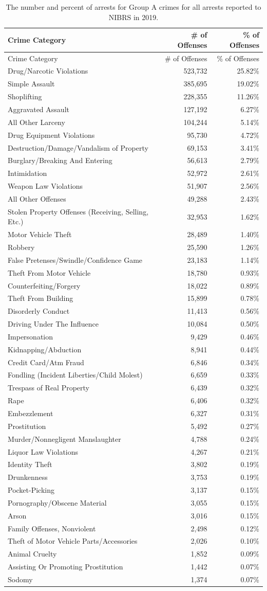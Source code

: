 \documentclass[
  12pt,
  openany]{book}
\begin{document}
\begin{longtable}[]{@{}lrr@{}}
\caption{\label{tab:arresteeCrime}The number and percent of arrests for Group A crimes for all arrests reported to NIBRS in 2019.}\tabularnewline
\toprule
Crime Category & \# of Offenses & \% of Offenses\tabularnewline
\midrule
\endfirsthead
\toprule
Crime Category & \# of Offenses & \% of Offenses\tabularnewline
\midrule
\endhead
Drug/Narcotic Violations & 523,732 & 25.82\%\tabularnewline
Simple Assault & 385,695 & 19.02\%\tabularnewline
Shoplifting & 228,355 & 11.26\%\tabularnewline
Aggravated Assault & 127,192 & 6.27\%\tabularnewline
All Other Larceny & 104,244 & 5.14\%\tabularnewline
Drug Equipment Violations & 95,730 & 4.72\%\tabularnewline
Destruction/Damage/Vandalism of Property & 69,153 & 3.41\%\tabularnewline
Burglary/Breaking And Entering & 56,613 & 2.79\%\tabularnewline
Intimidation & 52,972 & 2.61\%\tabularnewline
Weapon Law Violations & 51,907 & 2.56\%\tabularnewline
All Other Offenses & 49,288 & 2.43\%\tabularnewline
Stolen Property Offenses (Receiving, Selling, Etc.) & 32,953 & 1.62\%\tabularnewline
Motor Vehicle Theft & 28,489 & 1.40\%\tabularnewline
Robbery & 25,590 & 1.26\%\tabularnewline
False Pretenses/Swindle/Confidence Game & 23,183 & 1.14\%\tabularnewline
Theft From Motor Vehicle & 18,780 & 0.93\%\tabularnewline
Counterfeiting/Forgery & 18,022 & 0.89\%\tabularnewline
Theft From Building & 15,899 & 0.78\%\tabularnewline
Disorderly Conduct & 11,413 & 0.56\%\tabularnewline
Driving Under The Influence & 10,084 & 0.50\%\tabularnewline
Impersonation & 9,429 & 0.46\%\tabularnewline
Kidnapping/Abduction & 8,941 & 0.44\%\tabularnewline
Credit Card/Atm Fraud & 6,846 & 0.34\%\tabularnewline
Fondling (Incident Liberties/Child Molest) & 6,659 & 0.33\%\tabularnewline
Trespass of Real Property & 6,439 & 0.32\%\tabularnewline
Rape & 6,406 & 0.32\%\tabularnewline
Embezzlement & 6,327 & 0.31\%\tabularnewline
Prostitution & 5,492 & 0.27\%\tabularnewline
Murder/Nonnegligent Manslaughter & 4,788 & 0.24\%\tabularnewline
Liquor Law Violations & 4,267 & 0.21\%\tabularnewline
Identity Theft & 3,802 & 0.19\%\tabularnewline
Drunkenness & 3,753 & 0.19\%\tabularnewline
Pocket-Picking & 3,137 & 0.15\%\tabularnewline
Pornography/Obscene Material & 3,055 & 0.15\%\tabularnewline
Arson & 3,016 & 0.15\%\tabularnewline
Family Offenses, Nonviolent & 2,498 & 0.12\%\tabularnewline
Theft of Motor Vehicle Parts/Accessories & 2,026 & 0.10\%\tabularnewline
Animal Cruelty & 1,852 & 0.09\%\tabularnewline
Assisting Or Promoting Prostitution & 1,442 & 0.07\%\tabularnewline
Sodomy & 1,374 & 0.07\%\tabularnewline

\end{longtable}
\end{document}
